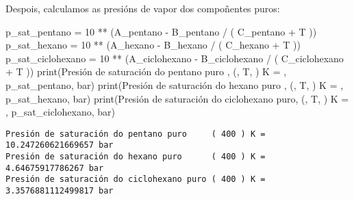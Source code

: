 \documentclass[
  letterpaper,
  DIV=11,
  numbers=noendperiod]{scrartcl}
\newenvironment{Shaded}{\begin{snugshade}}{\end{snugshade}}
\newcommand{\BuiltInTok}[1]{\textcolor[rgb]{0.00,0.23,0.31}{#1}}
\newcommand{\DecValTok}[1]{\textcolor[rgb]{0.68,0.00,0.00}{#1}}
\newcommand{\NormalTok}[1]{\textcolor[rgb]{0.00,0.23,0.31}{#1}}
\newcommand{\OperatorTok}[1]{\textcolor[rgb]{0.37,0.37,0.37}{#1}}
\newcommand{\StringTok}[1]{\textcolor[rgb]{0.13,0.47,0.30}{#1}}
\begin{document}
Despois, calculamos as presións de vapor dos compoñentes puros:

\begin{Shaded}
\begin{Highlighting}[]
\NormalTok{p\_sat\_pentano }\OperatorTok{=}  \DecValTok{10} \OperatorTok{**}\NormalTok{ (A\_pentano }\OperatorTok{{-}}\NormalTok{ B\_pentano }\OperatorTok{/}\NormalTok{ ( C\_pentano }\OperatorTok{+}\NormalTok{ T ))}
\NormalTok{p\_sat\_hexano }\OperatorTok{=}  \DecValTok{10} \OperatorTok{**}\NormalTok{ (A\_hexano }\OperatorTok{{-}}\NormalTok{ B\_hexano }\OperatorTok{/}\NormalTok{ ( C\_hexano }\OperatorTok{+}\NormalTok{ T ))}
\NormalTok{p\_sat\_ciclohexano }\OperatorTok{=}  \DecValTok{10} \OperatorTok{**}\NormalTok{ (A\_ciclohexano }\OperatorTok{{-}}\NormalTok{ B\_ciclohexano }\OperatorTok{/}\NormalTok{ ( C\_ciclohexano }\OperatorTok{+}\NormalTok{ T ))}
\BuiltInTok{print}\NormalTok{(}\StringTok{\textquotesingle{}Presión de saturación do pentano puro    \textquotesingle{}}\NormalTok{, }\StringTok{\textquotesingle{}(\textquotesingle{}}\NormalTok{, T, }\StringTok{\textquotesingle{}) K = \textquotesingle{}}\NormalTok{, p\_sat\_pentano, }\StringTok{\textquotesingle{}bar\textquotesingle{}}\NormalTok{)}
\BuiltInTok{print}\NormalTok{(}\StringTok{\textquotesingle{}Presión de saturación do hexano puro     \textquotesingle{}}\NormalTok{, }\StringTok{\textquotesingle{}(\textquotesingle{}}\NormalTok{, T, }\StringTok{\textquotesingle{}) K = \textquotesingle{}}\NormalTok{, p\_sat\_hexano, }\StringTok{\textquotesingle{}bar\textquotesingle{}}\NormalTok{)}
\BuiltInTok{print}\NormalTok{(}\StringTok{\textquotesingle{}Presión de saturación do ciclohexano puro\textquotesingle{}}\NormalTok{, }\StringTok{\textquotesingle{}(\textquotesingle{}}\NormalTok{, T, }\StringTok{\textquotesingle{}) K = \textquotesingle{}}\NormalTok{, p\_sat\_ciclohexano, }\StringTok{\textquotesingle{}bar\textquotesingle{}}\NormalTok{)}
\end{Highlighting}
\end{Shaded}

\begin{verbatim}
Presión de saturación do pentano puro     ( 400 ) K =  10.247260621669657 bar
Presión de saturación do hexano puro      ( 400 ) K =  4.64675917786267 bar
Presión de saturación do ciclohexano puro ( 400 ) K =  3.3576881112499817 bar
\end{verbatim}
\end{document}
